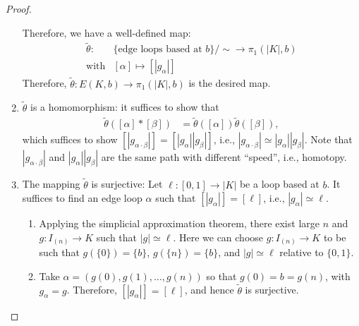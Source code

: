 \begin{proof}
\begin{enumerate}
Therefore, we have a well-defined map:
\[
\begin{array}{ll}
\tilde{\theta}:&\{\text{edge loops based at $b$}\}/\sim\to\pi_1(|K|,b)\\
\text{with}&[\alpha]\mapsto[|g_{\alpha}|]
\end{array}
\]
Therefore, $\tilde{\theta}:E(K,b)\to\pi_1(|K|,b)$ is the desired map.
\item
$\tilde{\theta}$ is a homomorphism:
it suffices to show that 
\begin{align*}
\tilde{\theta}([\alpha]*[\beta])&=\tilde{\theta}([\alpha])\tilde{\theta}([\beta]),
\end{align*}
which suffices to show $[|g_{\alpha\cdot\beta}|] = [|g_\alpha||g_{\beta}|]$, i.e., $|g_{\alpha\cdot\beta}|\simeq |g_\alpha||g_{\beta}|$.
Note that $|g_{\alpha\cdot\beta}|$ and $|g_\alpha||g_{\beta}|$ are the same path with different ``speed'', i.e., homotopy.
\item
The mapping $\tilde{\theta}$ is surjective:
Let $\ell:[0,1]\to|K|$ be a loop based at $b$.
It suffices to find an edge loop $\alpha$ such that $[|g_\alpha|]=[\ell]$, i.e., $|g_\alpha|\simeq\ell$.
\begin{enumerate}
\item
Applying the simplicial approximation theorem, there exist large $n$ and $g:I_{(n)}\to K$ such that $|g|\simeq\ell$.
Here we can choose $g:I_{(n)}\to K$ to be such that $g(\{0\})=\{b\}$, $g(\{n\})=\{b\}$, and $|g|\simeq\ell$ relative to $\{0,1\}$.
\item
Take $\alpha = (g(0),g(1),\dots,g(n))$ so that $g(0)=b=g(n)$, with $g_\alpha = g$.
Therefore, $[|g_\alpha|]=[\ell]$, and hence $\tilde{\theta}$ is surjective.
\end{enumerate}
\end{enumerate}
\end{proof}









